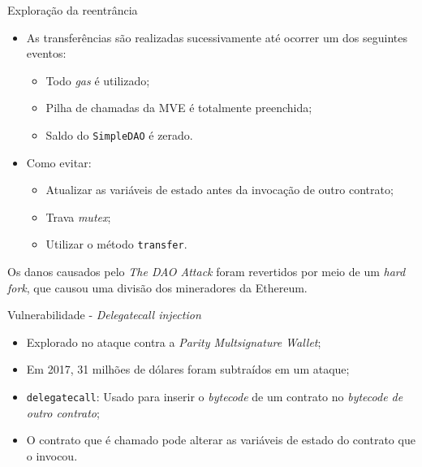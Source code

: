 \begin{frame}{Exploração da reentrância}
    \begin{itemize}
        \item As transferências são realizadas sucessivamente até ocorrer um dos seguintes eventos:
        \begin{itemize}
            \item Todo \textit{gas} é utilizado;
            \item Pilha de chamadas da MVE é totalmente preenchida;
            \item Saldo do \texttt{SimpleDAO} é zerado.
        \end{itemize}
        \item Como evitar:
        \begin{itemize}
            \item Atualizar as variáveis de estado antes da invocação de outro contrato;
            \item Trava \textit{mutex};
            \item Utilizar o método \texttt{transfer}.
        \end{itemize}
    \end{itemize}
    \begin{block}{}
    Os danos causados pelo \textit{The DAO Attack} foram revertidos por meio de um \textit{hard fork}, que causou uma divisão dos mineradores da Ethereum.
    \end{block}
\end{frame}

\begin{frame}{Vulnerabilidade - \textit{Delegatecall injection}}
    \begin{itemize}
        \item Explorado no ataque contra a \textit{Parity Multsignature Wallet};
        \item Em 2017, 31 milhões de dólares foram subtraídos em um ataque;
        \item \texttt{delegatecall}: Usado para inserir o \textit{bytecode} de um contrato no \textit{bytecode de outro contrato};
        \item O contrato que é chamado pode alterar as variáveis de estado do contrato que o invocou.
    \end{itemize}
\end{frame}

